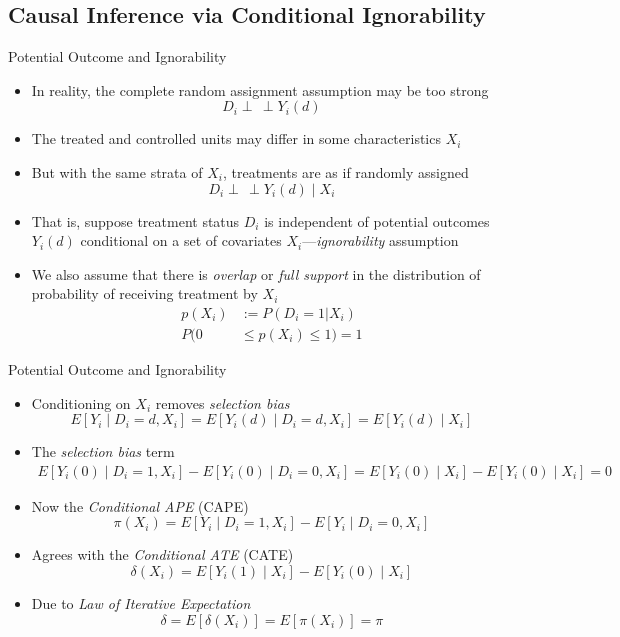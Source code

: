 \documentclass[aspectratio=1610,12pt,xcolor=dvipsnames]{beamer}
\newcommand{\indep}{\perp\!\!\!\, \perp}
\begin{document}
\subsection{Causal Inference via Conditional Ignorability}

\begin{frame}
  \subsectionpage
\end{frame}

\begin{frame}{Potential Outcome and Ignorability}

\begin{itemize}
    \item In reality, the complete random assignment assumption may be too strong
    \[D_i \indep Y_i(d)\]
    \item The treated and controlled units may differ in some characteristics $X_i$
    \item But with the same strata of $X_i$, treatments are as if randomly assigned
    \[D_i \indep Y_i(d) \mid X_i \]
    \item That is, suppose treatment status $D_i$ is independent of potential outcomes $Y_i(d)$ conditional on a set of covariates $X_i$—\textit{ignorability} assumption
    \item We also assume that there is \textit{overlap} or \textit{full support} in the distribution of probability of receiving treatment by $X_i$
    \begin{align*}
        p(X_i) &:= P(D_i=1|X_i) \\
        P(0 &\leq p(X_i) \leq1) = 1
    \end{align*}
\end{itemize}
\end{frame}

\begin{frame}{Potential Outcome and Ignorability}

\begin{itemize}
    \item Conditioning on $X_i$ removes \textit{selection bias}
  \[
  E[Y_i \mid D_i=d, X_i] = E[Y_i(d) \mid D_i=d, X_i] = E[Y_i(d) \mid X_i]
  \]
\item The \textit{selection bias} term  
  \begin{align*}
      E[Y_i(0) \mid D_i=1, X_i] - E[Y_i(0) \mid D_i=0, X_i] = E[Y_i(0) \mid X_i] - E[Y_i(0) \mid X_i] = 0
  \end{align*}
  \item Now the \textit{Conditional APE} (CAPE)
  \[
  \pi(X_i) = E[Y_i \mid D_i=1, X_i] - E[Y_i \mid D_i=0, X_i]
  \]
  \item Agrees with the \textit{Conditional ATE} (CATE)
  \[
  \delta(X_i) = E[Y_i(1) \mid X_i] - E[Y_i(0) \mid X_i]
  \]
  \item Due to \textit{Law of Iterative Expectation}
  \[\delta = E[\delta(X_i)] = E[\pi(X_i)] = \pi \]
\end{itemize}
\end{frame}
\end{document}
